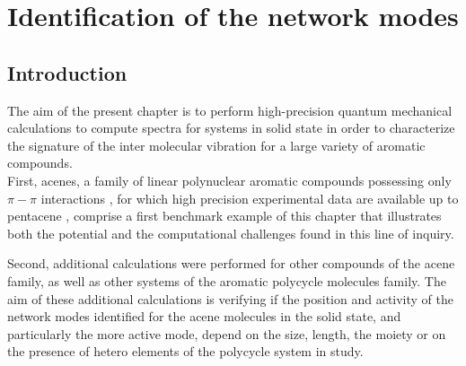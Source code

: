 \chapter[Phonon calculation]{Identification of the network modes}
\minitoc
\restoregeometry

\newpage


\section*{Introduction}

The aim of the present chapter is to perform high-precision quantum mechanical calculations to compute spectra for systems in solid state in order to characterize the signature of the inter molecular vibration for a large variety of aromatic compounds.\\

First, acenes, a family of linear polynuclear aromatic compounds possessing only $\pi-\pi$ interactions \cite{campbell1962crystal,mattheus2001polymorphism,brock1982temperature,facelli1993determination,brock1990temperature}, for which high precision experimental data are available up to pentacene \cite{michaelian2012far}, comprise a first benchmark example of this chapter that illustrates both the potential and the computational challenges found in this line of inquiry.

Second, additional calculations were performed for other compounds of the acene family, as well as other systems of the aromatic polycycle molecules family. The aim of these additional calculations is verifying if the position and activity of the network modes identified for the acene molecules in the solid state, and particularly the more active mode, depend on the size, length, the moiety or on the presence of hetero elements of the polycycle system in study.\\




